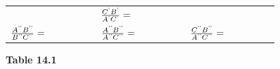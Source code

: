 {{\begin{center}
\begin{tabular}[t]{|l|l|l|}
               &
                $\frac{{C}^{\text{'}}{B}^{\text{'}}}{{A}^{\text{'}}{C}^{\text{'}}}=\phantom{\rule{42.67912pt}{0ex}}$
     \tabularnewline\cline{1-1}\cline{2-2}\cline{3-3}
                $\frac{{A}^{\text{'}\text{'}}{B}^{\text{'}\text{'}}}{{B}^{\text{'}\text{'}}{C}^{\text{'}\text{'}}}=\phantom{\rule{42.67912pt}{0ex}}$
               &
                $\frac{{A}^{\text{'}\text{'}}{B}^{\text{'}\text{'}}}{{A}^{\text{'}\text{'}}{C}^{\text{'}\text{'}}}=\phantom{\rule{42.67912pt}{0ex}}$
               &
                $\frac{{C}^{\text{'}\text{'}}{B}^{\text{'}\text{'}}}{{A}^{\text{'}\text{'}}{C}^{\text{'}\text{'}}}=\phantom{\rule{42.67912pt}{0ex}}$
     \tabularnewline\cline{1-1}\cline{2-2}\cline{3-3}
    \end{tabular}
      \end{center}
    \begin{center}{\small\bfseries Table 14.1}\end{center}
          }{ %
        \begin{center}
      \label{m39405*id78604}
    \noindent
      \tablelasttail{}
      \begin{xtabular}[t]{|l|l|l|}\hline

\end{xtabular}
\end{center}}}
